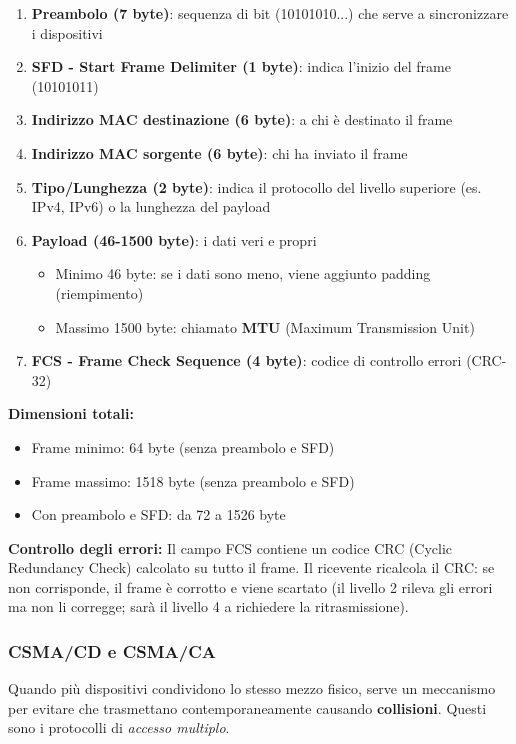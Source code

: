 \documentclass[12pt,a4paper]{article}
\begin{document}
\begin{enumerate}
    \item \textbf{Preambolo (7 byte)}: sequenza di bit (10101010...) che serve a sincronizzare i dispositivi
    \item \textbf{SFD - Start Frame Delimiter (1 byte)}: indica l'inizio del frame (10101011)
    \item \textbf{Indirizzo MAC destinazione (6 byte)}: a chi è destinato il frame
    \item \textbf{Indirizzo MAC sorgente (6 byte)}: chi ha inviato il frame
    \item \textbf{Tipo/Lunghezza (2 byte)}: indica il protocollo del livello superiore (es. IPv4, IPv6) o la lunghezza del payload
    \item \textbf{Payload (46-1500 byte)}: i dati veri e propri
    \begin{itemize}
        \item Minimo 46 byte: se i dati sono meno, viene aggiunto padding (riempimento)
        \item Massimo 1500 byte: chiamato \textbf{MTU} (Maximum Transmission Unit)
    \end{itemize}
    \item \textbf{FCS - Frame Check Sequence (4 byte)}: codice di controllo errori (CRC-32)
\end{enumerate}

\textbf{Dimensioni totali:}
\begin{itemize}
    \item Frame minimo: 64 byte (senza preambolo e SFD)
    \item Frame massimo: 1518 byte (senza preambolo e SFD)
    \item Con preambolo e SFD: da 72 a 1526 byte
\end{itemize}

\textbf{Controllo degli errori:}
Il campo FCS contiene un codice CRC (Cyclic Redundancy Check) calcolato su tutto il frame. Il ricevente ricalcola il CRC: se non corrisponde, il frame è corrotto e viene scartato (il livello 2 rileva gli errori ma non li corregge; sarà il livello 4 a richiedere la ritrasmissione).

\subsubsection{CSMA/CD e CSMA/CA}

Quando più dispositivi condividono lo stesso mezzo fisico, serve un meccanismo per evitare che trasmettano contemporaneamente causando \textbf{collisioni}. Questi sono i protocolli di \textit{accesso multiplo}.
\end{document}
